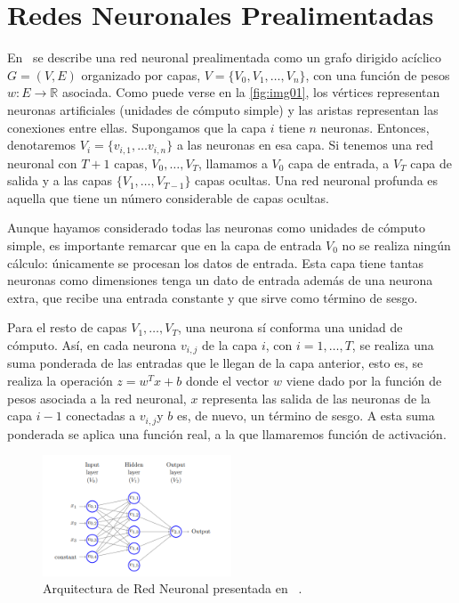 \section{Redes Neuronales Prealimentadas} 
 En~\cite{shalev-shwartz2014understanding} se describe una red neuronal prealimentada como un grafo dirigido acíclico $G=(V,E)$  organizado por capas, $V=\{V_{0},V_{1},\ldots,V_{n}\}$, con una función de pesos $w: E\rightarrow \mathds{R}$ asociada.  Como puede verse en la \autoref{fig:img01}, los vértices representan neuronas artificiales (unidades de cómputo simple) y las aristas representan las conexiones entre ellas. Supongamos que la capa $i$ tiene $n$ neuronas. Entonces, denotaremos $V_{i} = \{v_{i,1},\dots v_{i,n}\}$ a las neuronas en esa capa. Si tenemos una red neuronal con  $T+1$ capas, $V_{0},\dots,V_{T}$, llamamos a $V_{0}$ capa de entrada, a $V_{T}$ capa de salida y a las capas $\{V_{1},\dots , V_{T-1} \}$ capas ocultas. Una red neuronal profunda es aquella que tiene un número considerable de capas ocultas. 

 Aunque hayamos considerado todas las neuronas como unidades de cómputo simple, es importante remarcar que en la capa de entrada $V_{0}$ no se realiza ningún cálculo: únicamente se procesan los datos de entrada. Esta capa tiene tantas neuronas como dimensiones tenga un dato de entrada además de una neurona extra, que recibe una entrada constante y que sirve como término de sesgo. 
 
Para el resto de capas $V_{1},\dots ,V_{T}$, una neurona sí conforma una unidad de cómputo. Así, en cada neurona $v_{i,j}$ de la capa $i$, con $i=1,\dots,T$, se realiza una suma ponderada de las entradas que le llegan de la capa anterior, esto es, se realiza la operación $z = w^{T}x+b$ donde el vector $w$ viene dado por la función de pesos asociada a la red neuronal, $x$ representa las salida de las neuronas de la capa $i-1$ conectadas a $v_{i,j}$y $b$ es, de nuevo, un término de sesgo. A esta suma ponderada se aplica una función real, a la que llamaremos función de activación. \\ 
 \begin{figure}[ht]
    \centering
    \includegraphics[width=0.5\textwidth]{img/img01.png}
    \caption{Arquitectura de Red Neuronal presentada en  ~\cite{shalev-shwartz2014understanding}.}
    \label{fig:img01}
\end{figure}

